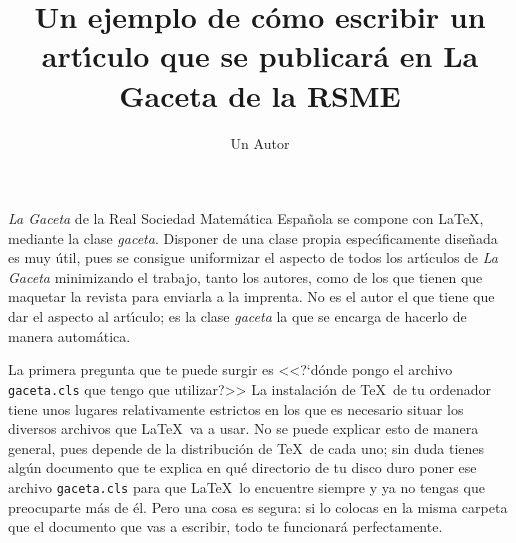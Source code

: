 \documentclass[autocontact]{gaceta}
\title{Un ejemplo de c\'omo escribir un art\'{\i}culo que 
se publicar\'a en La Gaceta de la RSME}
\author{Un Autor} %
\begin{document}

\makesupertitle





\maketitle



\textit{La Gaceta} de la Real Sociedad Matem\'atica Espa\~nola se compone con \LaTeX, mediante la clase \textit{gaceta}. Disponer de una clase propia espec\'{\i}ficamente dise\~nada es muy \'util, pues se consigue uniformizar el aspecto de todos los art\'{\i}culos de \textit{La Gaceta} minimizando el trabajo, tanto los autores, como de los que tienen que maquetar la revista para enviarla a la imprenta. No es el autor el que tiene que dar el aspecto al art\'{\i}culo; es la clase \textit{gaceta} la que se encarga de hacerlo de manera autom\'atica.

La primera pregunta que te puede surgir es <<?`d\'onde pongo el archivo \texttt{gaceta.cls} que tengo que utilizar?>> La instalaci\'on de \TeX\ de tu ordenador tiene unos lugares relativamente estrictos en los que es necesario situar los diversos archivos que \LaTeX\ va a usar. No se puede explicar esto de manera general, pues depende de la distribuci\'on de \TeX\ de cada uno; sin duda tienes alg\'un documento que te explica en qu\'e directorio de tu disco duro poner ese archivo \texttt{gaceta.cls} para que \LaTeX\ lo encuentre siempre y ya no tengas que preocuparte m\'as de \'el. Pero una cosa es segura: si lo colocas en la misma carpeta que el documento que vas a escribir, todo te funcionar\'a perfectamente.
\end{document}
